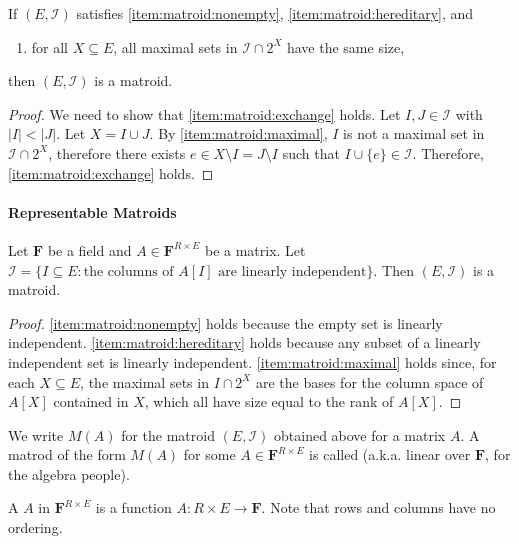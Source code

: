 \begin{proposition}
    If \((E, \mathcal{I})\) satisfies \ref{item:matroid:nonempty}, \ref{item:matroid:hereditary}, and
    \begin{enumerate}[label = \textup{(I\arabic*)}, start = 4]
        \item for all \(X \subseteq E\), all maximal sets in \(\mathcal{I} \cap 2^X\) have the same size, \label{item:matroid:maximal}
    \end{enumerate}
    then \((E, \mathcal{I})\) is a matroid.
\end{proposition}

\begin{proof}
    We need to show that \ref{item:matroid:exchange} holds.
    Let \(I, J \in \mathcal{I}\) with \(|I| < |J|\).
    Let \(X = I \cup J\).
    By \ref{item:matroid:maximal}, \(I\) is not a maximal set in \(\mathcal{I} \cap 2^X\), therefore there exists \(e \in X \setminus I = J \setminus I\) such that \(I \cup \{e\} \in \mathcal{I}\).
    Therefore, \ref{item:matroid:exchange} holds.
\end{proof}

\paragraph{Representable Matroids}

Let \(\mathbf{F}\) be a field and \(A \in \mathbf{F}^{R \times E}\) be a matrix.
Let \(\mathcal{I} = \{I \subseteq E : \text{the columns of } A[I] \text{ are linearly independent}\}\).
Then \((E, \mathcal{I})\) is a matroid.

\begin{proof}
    \ref{item:matroid:nonempty} holds because the empty set is linearly independent.
    \ref{item:matroid:hereditary} holds because any subset of a linearly independent set is linearly independent.
    \ref{item:matroid:maximal} holds since, for each \(X \subseteq E\), the maximal sets in \(I \cap 2^X\) are the bases for the column space of \(A[X]\) contained in \(X\), which all have size equal to the rank of \(A[X]\).
\end{proof}

We write \(M(A)\) for the matroid \((E, \mathcal{I})\) obtained above for a matrix \(A\).
A matrod of the form \(M(A)\) for some \(A \in \mathbf{F}^{R \times E}\) is called  (a.k.a. linear over \(\mathbf{F}\), for the algebra people).

A  \(A\) in \(\mathbf{F}^{R \times E}\) is a function \(A \colon R \times E \to \mathbf{F}\).
Note that rows and columns have no ordering.

